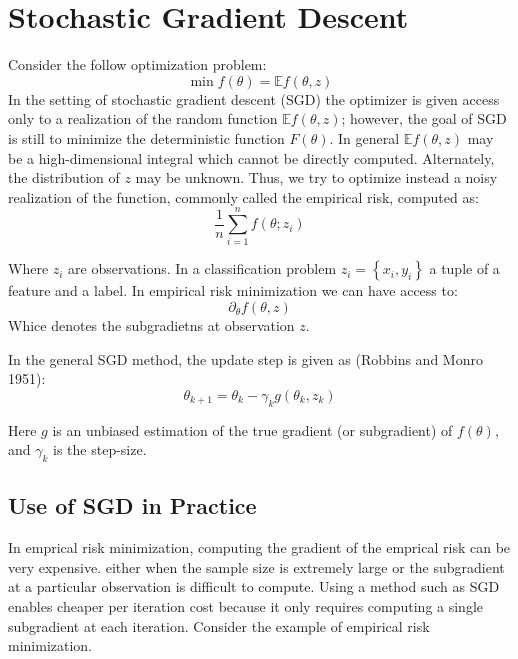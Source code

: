 \section{Stochastic Gradient Descent}
Consider the follow optimization problem:
\begin{equation*}
	\min f(\theta) = \mathbb{E}f(\theta, z)
\end{equation*}
In the setting of stochastic gradient descent (SGD) the optimizer is given access only to a realization of the random function $\mathbb{E} f (\theta, z)$; however, the goal of SGD is still to minimize the deterministic function $F(\theta)$. 
In general $\mathbb{E}f(\theta, z)$ may be a high-dimensional integral which cannot be directly computed. Alternately, the distribution of $z$ may be unknown. Thus, we try to optimize instead a noisy realization of the function, commonly called the empirical risk, computed as:
\begin{equation*}
	\frac{1}{n}\sum_{i=1}^{n} f(\theta; z_i)
\end{equation*}

Where $z_i$ are observations. In a classification problem $z_i = \left\{x_i, y_i\right\}$ a tuple of a feature and a label. In empirical risk minimization  we can have access to:
\begin{equation*}
	\partial_{\theta} f (\theta,z)
\end{equation*}
Whice denotes the subgradietns at observation $z$. 

In the general SGD method, the update step is given as (Robbins and Monro 1951): 
\begin{equation*}
	\theta_{k+1} = \theta_k - \gamma_k g\left(\theta_k, z_k\right)
\end{equation*}

Here $g$ is an unbiased estimation of the true gradient (or subgradient) of $f(\theta)$, and $\gamma_k$ is the step-size. 

\subsection{Use of SGD in Practice}
In emprical risk minimization, computing the gradient of the emprical risk can be very expensive. either when the sample size is extremely large or the subgradient at a particular observation is difficult to compute. 
Using a method such as SGD enables cheaper per iteration cost because it only requires computing a single subgradient at each iteration. Consider the example of empirical risk minimization. 

